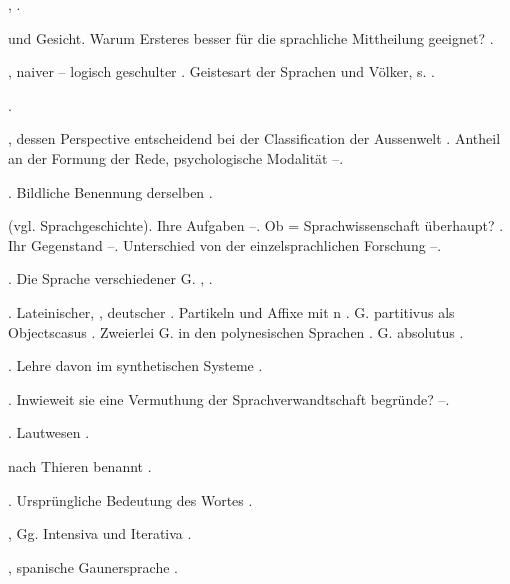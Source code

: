 \begin{register}
 \pageref{sp.244}, \pageref{sp.381}.

 und Gesicht. Warum Ersteres besser für die sprachliche Mittheilung geeignet? \pageref{sp.312}.


, naiver – logisch geschulter \pageref{sp.39}. Geistesart der Sprachen und Völker, s. .

 \pageref{sp.307}.

, dessen Perspective entscheidend bei der Classification der Aussenwelt \pageref{sp.307}.  Antheil an der Formung der Rede, psychologische Modalität \pageref{sp.472}–\pageref{sp.474}.

. Bildliche Benennung derselben \pageref{sp.43}.


 (vgl. Sprachgeschichte). Ihre Aufgaben \pageref{sp.9}–\pageref{sp.10}. Ob = Sprachwissenschaft überhaupt? \pageref{sp.11}. Ihr Gegenstand \pageref{sp.135}–\pageref{sp.146}. Unterschied von der einzelsprachlichen Forschung \pageref{sp.138}–\pageref{sp.142}.

. Die Sprache verschiedener G. \pageref{sp.258}, \pageref{sp.284}.

  \pageref{sp.101}. Lateinischer, , deutscher \pageref{sp.115}. Partikeln und Affixe mit n \pageref{sp.153}. G. partitivus als Objectscasus \pageref{sp.462}. Zweierlei G. in den polynesischen Sprachen \pageref{sp.463}. G. absolutus \pageref{sp.467}.

. Lehre davon im synthetischen Systeme \pageref{sp.101}.

. Inwieweit sie eine Vermuthung der Sprachverwandtschaft begründe? \pageref{sp.146}–\pageref{sp.147}.

. Lautwesen \pageref{sp.34}.

 nach Thieren benannt \pageref{sp.41}.

. Ursprüngliche Bedeutung des Wortes \pageref{sp.229}.

, Gg. Intensiva und Iterativa \pageref{sp.481}.

, spanische Gaunersprache \pageref{sp.288}.


\end{register}
